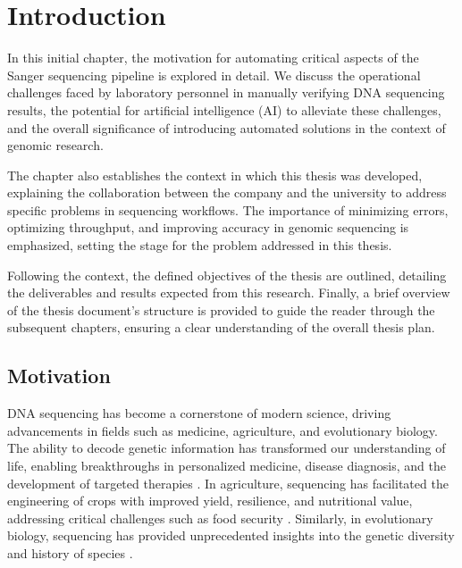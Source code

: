 
%

\chapter{Introduction}
\label{cha:Introduction}


In this initial chapter, the motivation for automating critical aspects of the Sanger sequencing pipeline is explored in detail. We discuss the operational challenges faced by laboratory personnel in manually verifying DNA sequencing results, the potential for artificial intelligence (AI) to alleviate these challenges, and the overall significance of introducing automated solutions in the context of genomic research.

The chapter also establishes the context in which this thesis was developed, explaining the collaboration between the company and the university to address specific problems in sequencing workflows. The importance of minimizing errors, optimizing throughput, and improving accuracy in genomic sequencing is emphasized, setting the stage for the problem addressed in this thesis.

Following the context, the defined objectives of the thesis are outlined, detailing the deliverables and results expected from this research. Finally, a brief overview of the thesis document's structure is provided to guide the reader through the subsequent chapters, ensuring a clear understanding of the overall thesis plan.

\section{Motivation}
\label{sec:Motivation}

DNA sequencing has become a cornerstone of modern science, driving advancements in fields such as medicine, agriculture, and evolutionary biology. The ability to decode genetic information has transformed our understanding of life, enabling breakthroughs in personalized medicine, disease diagnosis, and the development of targeted therapies \cite{green2015human}. In agriculture, sequencing has facilitated the engineering of crops with improved yield, resilience, and nutritional value, addressing critical challenges such as food security \cite{varshney2014genomics}. Similarly, in evolutionary biology, sequencing has provided unprecedented insights into the genetic diversity and history of species \cite{shendure2017dna}.

